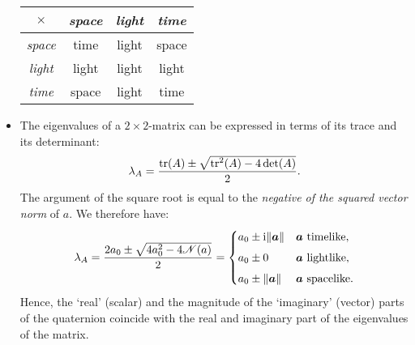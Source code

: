 \begin{itemize}
\begin{table}[h!]
\begin{tabular}{c|ccc}
            \toprule
            $\times$ & \emph{space} & \emph{light} & \emph{time} \\[1mm]
            \hline
            \emph{space} & time  & light & space \\
            \emph{light} & light & light & light \\
            \emph{time} &  space & light & time \\
            \bottomrule
        \end{tabular}
        \end{table}
    \item The eigenvalues of a $2\times2$-matrix can be expressed in terms of its trace and its determinant:
        $$ \lambda_A = \frac{\trace(A) \pm \sqrt{\trace^2(A) - 4\det(A)}}{2}.$$
        The argument of the square root is equal to the \emph{negative of the squared vector norm} of $a$. We therefore have:
        \begin{equation}
            \lambda_A = \frac{2a_0 \pm \sqrt{4 a_0^2 - 4\mathscr{N}(a)}}{2} = 
            \begin{cases}
                a_0 \pm \ii\norm{\vec{a}} & \vec{a} \text{ timelike},\\[1ex]
                a_0 \pm 0  & \vec{a} \text{ lightlike},\\[1ex]
                a_0 \pm \norm{\vec{a}} & \vec{a} \text{ spacelike}.\\
            \end{cases}
            \label{eq:quat_eigvals}
        \end{equation}
        Hence, the `real' (scalar) and the magnitude of the `imaginary' (vector) parts of the quaternion coincide with the real and imaginary part of the eigenvalues of the matrix.
\end{itemize}


